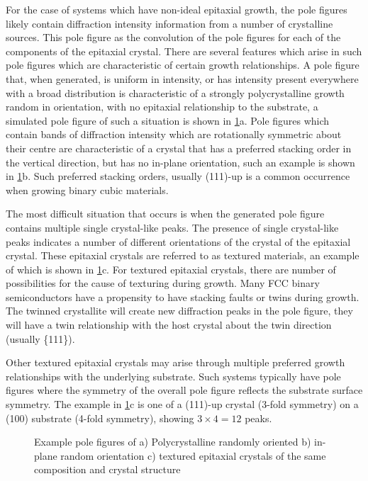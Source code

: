 For the case of systems which have non-ideal epitaxial growth, the pole figures likely contain diffraction intensity information from a number of crystalline sources. This pole figure as the convolution of the pole figures for each of the components of the epitaxial crystal. There are several features which arise in such pole figures which are characteristic of certain growth relationships. A pole figure that, when generated, is uniform in intensity, or has intensity present everywhere with a broad distribution is characteristic of a strongly polycrystalline growth random in orientation, with no epitaxial relationship to the substrate, a simulated pole figure of such a situation is shown in \cref{fig:exp_xray_polefigure_examples}a. Pole figures which contain bands of diffraction intensity which are rotationally symmetric about their centre are characteristic of a crystal that has a preferred stacking order in the vertical direction, but has no in-plane orientation, such an example is shown in \cref{fig:exp_xray_polefigure_examples}b. Such preferred stacking orders, usually (111)-up is a common occurrence when growing binary cubic materials.

The most difficult situation that occurs is when the generated pole figure contains multiple single crystal-like peaks. The presence of single crystal-like peaks indicates a number of different orientations of the crystal of the epitaxial crystal. These epitaxial crystals are referred to as textured materials, an example of which is shown in \cref{fig:exp_xray_polefigure_examples}c. For textured epitaxial crystals, there are number of possibilities for the cause of texturing during growth. Many FCC binary semiconductors have a propensity to have stacking faults or twins during growth. The twinned crystallite will create new diffraction peaks in the pole figure, they will have a twin relationship with the host crystal about the twin direction (usually \{111\}).

Other textured epitaxial crystals may arise through multiple preferred growth relationships with the underlying substrate. Such systems typically have pole figures where the symmetry of the overall pole figure reflects the substrate surface symmetry. The example in \cref{fig:exp_xray_polefigure_examples}c is one of a (111)-up crystal (3-fold symmetry) on a (100) substrate (4-fold symmetry), showing $3\times 4=12$ peaks.
\begin{figure}
    \centering
    \caption{\label{fig:exp_xray_polefigure_examples}Example pole figures of a) Polycrystalline randomly oriented b) in-plane random orientation c) textured epitaxial crystals of the same composition and crystal structure}
\end{figure}

